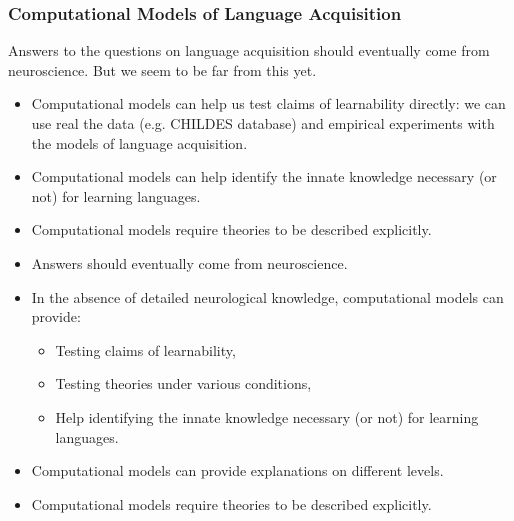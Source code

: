 \begin{frame}
\frametitle{Computational Models of Language Acquisition}

Answers to the questions on language acquisition should eventually
come from neuroscience. But we seem to be far from this yet.

\begin{itemize}
\item Computational models can help us test claims of learnability 
      directly: we can use real the data (e.g. CHILDES database) and 
      empirical experiments with the models of language acquisition.
\item Computational models can help identify the innate knowledge 
      necessary (or not) for learning languages.
\item Computational models require theories to be described explicitly.
\end{itemize}

\begin{itemize}
\item Answers should eventually come from neuroscience.
\item In the absence of detailed neurological knowledge, computational
models can provide:
    \begin{itemize}
    \item Testing claims of learnability,
    \item Testing theories under various conditions,
    \item Help identifying the innate knowledge necessary (or not) for
          learning languages.
    \end{itemize}
\item Computational models can provide explanations on different
      levels.
\item Computational models require theories to be described explicitly.
\end{itemize}

\end{frame}
